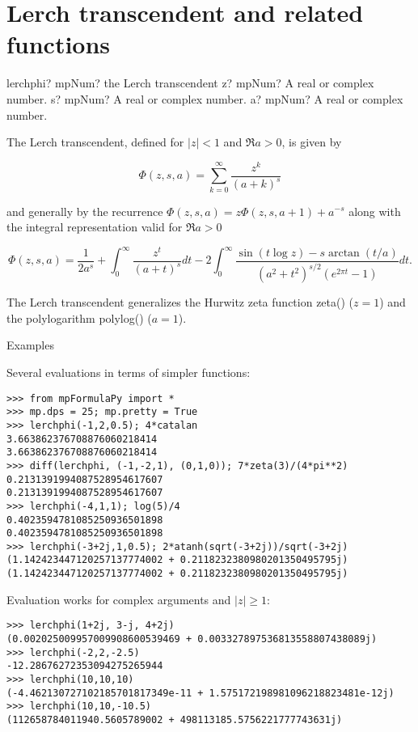 \section{Lerch transcendent and related functions}


\begin{mpFunctionsExtract}
	\mpFunctionThree
	{lerchphi? mpNum? the Lerch transcendent}
	{z? mpNum? A real or complex number.}
	{s? mpNum? A real or complex number.}	
	{a? mpNum? A real or complex number.}		
\end{mpFunctionsExtract}

\vpara
The Lerch transcendent, defined for $|z|<1$ and $\Re a >0$, is given by

\begin{equation}
\Phi(z,s,a) = \sum_{k=0}^{\infty} \frac{z^k}{(a+k)^s}
\end{equation}

and generally by the recurrence $\Phi(z,s,a) = z\Phi(z,s,a+1) +a^{-s}$  along with the integral representation valid for $\Re a>0$

\begin{equation}
\Phi(z,s,a) = \frac{1}{2a^s} + \int_0^{\infty} \frac{z^t}{(a+t)^s} dt - 2 \int_0^{\infty} \frac{\sin(t\log z) - s \arctan(t/a)}{(a^2+t^2)^{s/2}(e^{2\pi t}-1)} dt.
\end{equation}


The Lerch transcendent generalizes the Hurwitz zeta function zeta() ($z=1$) and the polylogarithm polylog() ($a=1$).

Examples

Several evaluations in terms of simpler functions:


\begin{lstlisting}
>>> from mpFormulaPy import *
>>> mp.dps = 25; mp.pretty = True
>>> lerchphi(-1,2,0.5); 4*catalan
3.663862376708876060218414
3.663862376708876060218414
>>> diff(lerchphi, (-1,-2,1), (0,1,0)); 7*zeta(3)/(4*pi**2)
0.2131391994087528954617607
0.2131391994087528954617607
>>> lerchphi(-4,1,1); log(5)/4
0.4023594781085250936501898
0.4023594781085250936501898
>>> lerchphi(-3+2j,1,0.5); 2*atanh(sqrt(-3+2j))/sqrt(-3+2j)
(1.142423447120257137774002 + 0.2118232380980201350495795j)
(1.142423447120257137774002 + 0.2118232380980201350495795j)
\end{lstlisting}

Evaluation works for complex arguments and $|z|\geq 1$:
\begin{lstlisting}
>>> lerchphi(1+2j, 3-j, 4+2j)
(0.002025009957009908600539469 + 0.003327897536813558807438089j)
>>> lerchphi(-2,2,-2.5)
-12.28676272353094275265944
>>> lerchphi(10,10,10)
(-4.462130727102185701817349e-11 + 1.575172198981096218823481e-12j)
>>> lerchphi(10,10,-10.5)
(112658784011940.5605789002 + 498113185.5756221777743631j)
\end{lstlisting}





